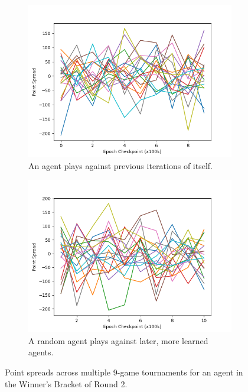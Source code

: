 
\begin{figure}
\center

\begin{subfigure}[b]{0.90\textwidth}
	\includegraphics[width=\linewidth]{images/findings/round2/spreads_self-v-prev_winner.png}
	\caption{An agent plays against previous iterations of itself.}
	\label{fig:r2-spreads-winner-a}
\end{subfigure}

\begin{subfigure}[b]{0.90\textwidth}
	\includegraphics[width=\linewidth]{images/findings/round2/spreads_rand-v-fut_winner.png}
	\caption{A random agent plays against later, more learned agents.}
	\label{fig:r2-spreads-winner-b}
\end{subfigure}

\caption{
	Point spreads across multiple 9-game tournaments for an agent in the
	Winner's Bracket of Round 2.
}
\label{fig:r2-spreads-winner}
\end{figure}
